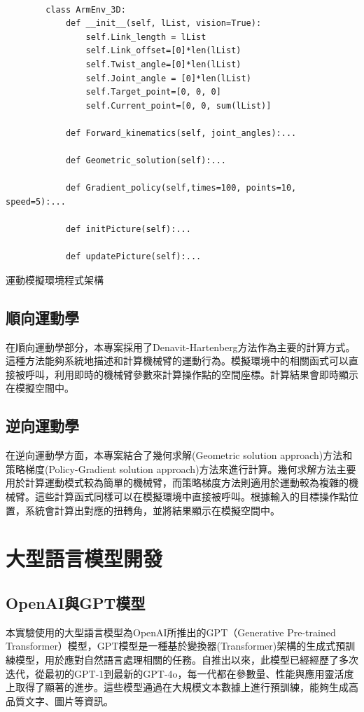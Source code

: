 \documentclass[class=NCU_thesis, crop=false]{standalone}
\begin{document}
\begin{listing}
    \begin{verbatim}

        class ArmEnv_3D:
            def __init__(self, lList, vision=True):
                self.Link_length = lList
                self.Link_offset=[0]*len(lList)
                self.Twist_angle=[0]*len(lList)
                self.Joint_angle = [0]*len(lList)
                self.Target_point=[0, 0, 0]
                self.Current_point=[0, 0, sum(lList)]

            def Forward_kinematics(self, joint_angles):...
            
            def Geometric_solution(self):...

            def Gradient_policy(self,times=100, points=10, speed=5):...

            def initPicture(self):...

            def updatePicture(self):...

    \end{verbatim}
\caption{運動模擬環境程式架構} 
\end{listing}

\subsection{順向運動學}
在順向運動學部分，本專案採用了Denavit-Hartenberg方法作為主要的計算方式。這種方法能夠系統地描述和計算機械臂的運動行為。模擬環境中的相關函式可以直接被呼叫，利用即時的機械臂參數來計算操作點的空間座標。計算結果會即時顯示在模擬空間中。

\subsection{逆向運動學}
在逆向運動學方面，本專案結合了幾何求解(Geometric solution approach)方法和策略梯度(Policy-Gradient solution approach)方法來進行計算。幾何求解方法主要用於計算運動模式較為簡單的機械臂，而策略梯度方法則適用於運動較為複雜的機械臂。這些計算函式同樣可以在模擬環境中直接被呼叫。根據輸入的目標操作點位置，系統會計算出對應的扭轉角，並將結果顯示在模擬空間中。

\section{大型語言模型開發}
\subsection{OpenAI與GPT模型}
本實驗使用的大型語言模型為OpenAI所推出的GPT（Generative Pre-trained Transformer）模型，GPT模型是一種基於變換器(Transformer)架構的生成式預訓練模型，用於應對自然語言處理相關的任務。自推出以來，此模型已經經歷了多次迭代，從最初的GPT-1到最新的GPT-4o，每一代都在參數量、性能與應用靈活度上取得了顯著的進步。這些模型通過在大規模文本數據上進行預訓練，能夠生成高品質文字、圖片等資訊。
\end{document}
